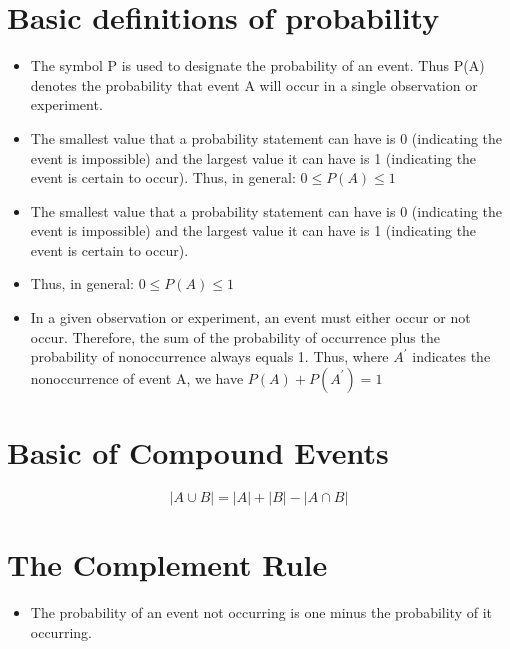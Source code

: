 \documentclass[]{report}
\begin{document}
{{{{{{\section{Basic definitions of probability}
\begin{itemize}
\item The symbol P is used to designate the probability of an event. Thus P(A) denotes the probability that event
A will occur in a single observation or experiment.
\item The smallest value that a probability statement can have is 0 (indicating the event is impossible) and the
largest value it can have is 1 (indicating the event is certain to occur). Thus, in general:
$0 \leq P(A) \leq 1$
\item The smallest value that a probability statement can have is 0 (indicating the event is impossible) and the
largest value it can have is 1 (indicating the event is certain to occur). 
\item Thus, in general:
$0 \leq P(A) \leq 1$
\item 
In a given observation or experiment, an event must either occur or not occur. Therefore, the sum of the
probability of occurrence plus the probability of nonoccurrence always equals 1. Thus, where $A^{\prime}$ indicates the nonoccurrence of event A, we have
$P(A) + P(A^{\prime}) =  1$
\end{itemize}




}


















\section{Basic of Compound Events}


\[ |A \cup B| = |A| + |B| - |A \cap B|  \]








\section{The Complement Rule}
\begin{itemize}
\item 
The probability of an event not occurring is one minus the probability of it occurring.


\end{itemize}}}}}}
\end{document}
